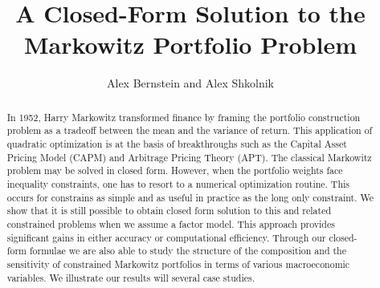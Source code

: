 \documentclass{article}
\title{A Closed-Form Solution to the Markowitz Portfolio Problem}
\author{Alex Bernstein and Alex Shkolnik}
\begin{document}
\begin{titlingpage}
    \maketitle
    \begin{abstract}
      In 1952, Harry Markowitz transformed finance by framing the portfolio construction problem as a tradeoff between the mean and the variance of return. This application of quadratic optimization is at the basis of breakthroughs such as the Capital Asset Pricing Model (CAPM) and Arbitrage Pricing Theory (APT). The classical Markowitz problem may be solved in closed form. However, when the portfolio weights face inequality constraints, one has to resort to a numerical optimization routine. This occurs for constrains as simple and as useful in practice as the long only constraint. We show that it is still possible to obtain closed form solution to this and related constrained problems when we assume a factor model. This approach provides significant gains in either accuracy or computational efficiency. Through our closed-form formulae we are also able to study the structure of the composition and the sensitivity of constrained Markowitz portfolios in terms of various macroeconomic variables. We illustrate our results will several case studies.
    \end{abstract}
\end{titlingpage}
\end{document}
